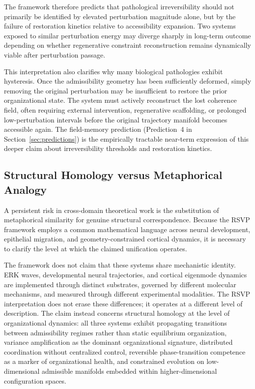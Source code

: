\documentclass[11pt,a4paper]{article}
\theoremstyle{plain}
\theoremstyle{definition}
\begin{document}
The framework therefore predicts that pathological irreversibility should not primarily
be identified by elevated perturbation magnitude alone, but by the failure of restoration
kinetics relative to accessibility expansion. Two systems exposed to similar perturbation
energy may diverge sharply in long-term outcome depending on whether regenerative
constraint reconstruction remains dynamically viable after perturbation passage.

This interpretation also clarifies why many biological pathologies exhibit hysteresis.
Once the admissibility geometry has been sufficiently deformed, simply removing the
original perturbation may be insufficient to restore the prior organizational state.
The system must actively reconstruct the lost coherence field, often requiring external
intervention, regenerative scaffolding, or prolonged low-perturbation intervals before
the original trajectory manifold becomes accessible again. The field-memory prediction
(Prediction~4 in Section~\ref{sec:predictions}) is the empirically tractable near-term
expression of this deeper claim about irreversibility thresholds and restoration kinetics.

\subsection{Structural Homology versus Metaphorical Analogy}

A persistent risk in cross-domain theoretical work is the substitution of metaphorical
similarity for genuine structural correspondence. Because the RSVP framework employs a
common mathematical language across neural development, epithelial migration, and
geometry-constrained cortical dynamics, it is necessary to clarify the level at which
the claimed unification operates.

The framework does not claim that these systems share mechanistic identity. ERK waves,
developmental neural trajectories, and cortical eigenmode dynamics are implemented
through distinct substrates, governed by different molecular mechanisms, and measured
through different experimental modalities. The RSVP interpretation does not erase
these differences; it operates at a different level of description. The claim instead
concerns structural homology at the level of organizational dynamics: all three systems
exhibit propagating transitions between admissibility regimes rather than static
equilibrium organization, variance amplification as the dominant organizational signature,
distributed coordination without centralized control, reversible phase-transition
competence as a marker of organizational health, and constrained evolution on
low-dimensional admissible manifolds embedded within higher-dimensional configuration
spaces.
\end{document}

